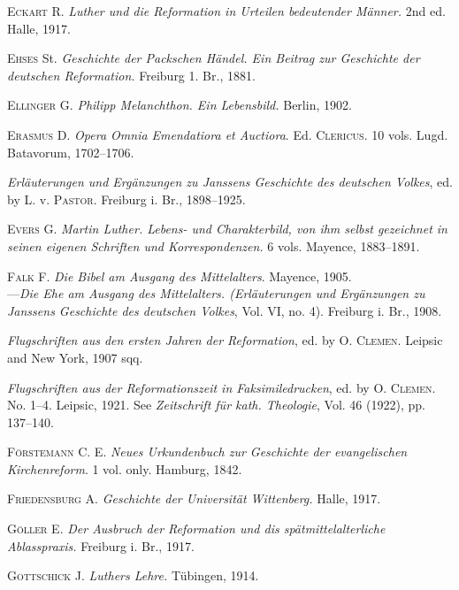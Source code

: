 \textsc{Eckart R.} \textit{Luther und die Reformation in Urteilen bedeutender Männer.}
2nd ed. Halle, 1917.

\textsc{Ehses} St. \textit{Geschichte der Packschen Händel. Ein Beitrag zur Geschichte der
deutschen Reformation.} Freiburg 1. Br., 1881.

\textsc{Ellinger G.} \textit{Philipp Melanchthon. Ein Lebensbild.} Berlin, 1902.

\textsc{Erasmus D.} \textit{Opera Omnia Emendatiora et Auctiora}. Ed. \textsc{Clericus}. 10
vols. Lugd. Batavorum, 1702--1706.

\textit{Erläuterungen und Ergänzungen zu Janssens Geschichte des deutschen Volkes},
ed. by L. v. \textsc{Pastor.} Freiburg i. Br., 1898--1925.

\textsc{Evers G.} \textit{Martin Luther. Lebens- und Charakterbild, von ihm selbst gezeichnet
in seinen eigenen Schriften und Korrespondenzen.} 6 vols. Mayence,
1883--1891.

\textsc{Falk F.} \textit{Die Bibel am Ausgang des Mittelalters}. Mayence, 1905. \\
---\textit{Die Ehe am Ausgang des Mittelalters. (Erläuterungen und Ergänzungen
zu Janssens Geschichte des deutschen Volkes}, Vol. VI, no. 4).
Freiburg i. Br., 1908.

\textit{Flugschriften aus den ersten Jahren der Reformation}, ed. by \textsc{O. Clemen.}
Leipsic and New York, 1907 sqq.

\textit{Flugschriften aus der Reformationszeit in Faksimiledrucken}, ed. by \textsc{O.
Clemen.} No. 1--4. Leipsic, 1921. See \textit{Zeitschrift für kath. Theologie}, Vol.
46 (1922), pp. 137--140.

\textsc{Förstemann C. E.} \textit{Neues Urkundenbuch zur Geschichte der evangelischen
Kirchenreform}. 1 vol. only. Hamburg, 1842.

\textsc{Friedensburg A.} \textit{Geschichte der Universität Wittenberg.} Halle, 1917.

\textsc{Göller E.} \textit{Der Ausbruch der Reformation und dis spätmittelalterliche
Ablasspraxis.} Freiburg i. Br., 1917.

\textsc{Gottschick J.} \textit{Luthers Lehre.} Tübingen, 1914.

